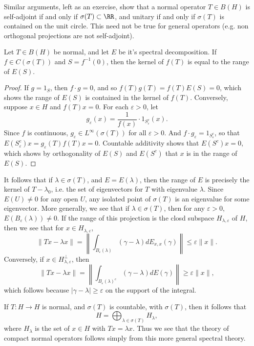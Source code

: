 Similar arguments, left as an exercise, show that a normal operator $T \in B(H)$ is self-adjoint if and only if $\sigma(T) \subset \RR$, and unitary if and only if $\sigma(T)$ is contained on the unit circle. This need not be true for general operators (e.g. non orthogonal projections are not self-adjoint).

\begin{theorem}
    Let $T \in B(H)$ be normal, and let $E$ be it's spectral decomposition. If $f \in C(\sigma(T))$ and $S = f^{-1}(0)$, then the kernel of $f(T)$ is equal to the range of $E(S)$.
\end{theorem}
\begin{proof}
    If $g = 1_S$, then $f \cdot g = 0$, and so $f(T) g(T) = f(T) E(S) = 0$, which shows the range of $E(S)$ is contained in the kernel of $f(T)$. Conversely, suppose $x \in H$ and $f(T) x = 0$. For each $\varepsilon > 0$, let
    \[ g_\varepsilon(x) = \frac{1}{f(x)} \cdot 1_{S_\varepsilon^c}(x). \]
    Since $f$ is continuous, $g_\varepsilon \in L^\infty(\sigma(T))$ for all $\varepsilon > 0$. And $f \cdot g_\varepsilon = 1_{S_\varepsilon^c}$, so that $E(S_\varepsilon^c) x = g_\varepsilon(T) f(T) x = 0$. Countable additivity shows that $E(S^c) x = 0$, which shows by orthogonality of $E(S)$ and $E(S^c)$ that $x$ is in the range of $E(S)$.
\end{proof}

It follows that if $\lambda \in \sigma(T)$, and $E = E(\lambda)$, then the range of $E$ is precisely the kernel of $T - \lambda_0$, i.e. the set of eigenvectors for $T$ with eigenvalue $\lambda$. Since $E(U) \neq 0$ for any open $U$, any isolated point of $\sigma(T)$ is an eigenvalue for some eigenvector. More generally, we see that if $\lambda \in \sigma(T)$, then for any $\varepsilon > 0$, $E(B_\varepsilon(\lambda)) \neq 0$. If the range of this projection is the closd subspace $H_{\lambda,\varepsilon}$ of $H$, then we see that for $x \in H_{\lambda,\varepsilon}$,
%
\[ \| Tx - \lambda x \| = \left\| \int_{B_\varepsilon(\lambda)} (\gamma - \lambda) dE_{x,x}(\gamma) \right\| \leq \varepsilon \| x \|. \]
%
Conversely, if $x \in H_{\lambda,\varepsilon}^\perp$, then
%
\[ \| Tx - \lambda x \| = \left\| \int_{B_\varepsilon(\lambda)^c} (\gamma - \lambda) dE(\gamma) \right\| \geq \varepsilon \| x \|, \]
%
which follows because $|\gamma - \lambda| \geq \varepsilon$ on the support of the integral.

If $T: H \to H$ is normal, and $\sigma(T)$ is countable, with $\sigma(T)$, then it follows that
%
\[ H = \bigoplus_{\lambda \in \sigma(T)} H_\lambda, \]
%
where $H_\lambda$ is the set of $x \in H$ with $Tx = \lambda x$. Thus we see that the theory of compact normal operators follows simply from this more general spectral theory.


